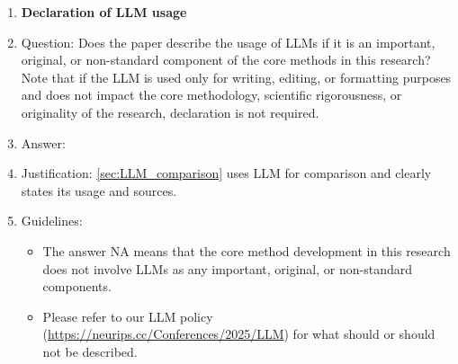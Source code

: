 \documentclass{article}
\begin{document}
\begin{enumerate}
\begin{itemize}
        \item Depending on the country in which research is conducted, IRB approval (or equivalent) may be required for any human subjects research. If you obtained IRB approval, you should clearly state this in the paper.
        \item We recognize that the procedures for this may vary significantly between institutions and locations, and we expect authors to adhere to the NeurIPS Code of Ethics and the guidelines for their institution.
        \item For initial submissions, do not include any information that would break anonymity (if applicable), such as the institution conducting the review.
    \end{itemize}
\item {\bf Declaration of LLM usage}
    \item[] Question: Does the paper describe the usage of LLMs if it is an important, original, or non-standard component of the core methods in this research? Note that if the LLM is used only for writing, editing, or formatting purposes and does not impact the core methodology, scientific rigorousness, or originality of the research, declaration is not required.
    \item[] Answer: \answerYes{}
    \item[] Justification: \cref{sec:LLM_comparison} uses LLM for comparison and clearly states its usage and sources.
    \item[] Guidelines:
    \begin{itemize}
        \item The answer NA means that the core method development in this research does not involve LLMs as any important, original, or non-standard components.
        \item Please refer to our LLM policy (\url{https://neurips.cc/Conferences/2025/LLM}) for what should or should not be described.
    \end{itemize}
\end{enumerate}
\appendix
\end{document}
